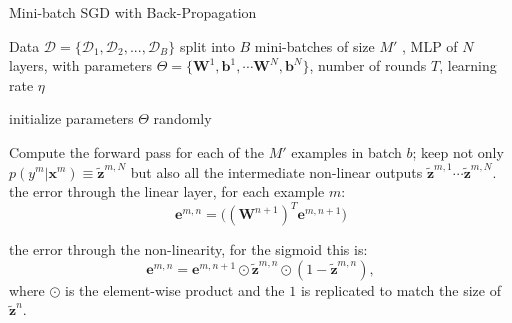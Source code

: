 \begin{algorithm}[th!]

   \caption{Mini-batch SGD with Back-Propagation}

\begin{algorithmic}[1]
\label{algo:backprop}

Data $\mathcal{D}=\{\mathcal{D}_1,\mathcal{D}_2,...,\mathcal{D}_B\}$ split into $B$ mini-batches of size $M'$%
, MLP of $N$ layers, with parameters $\Theta=\{\mathbf{W}^1, \mathbf{b}^1, \cdots \mathbf{W}^N, \mathbf{b}^N\}$, number of rounds $T$, learning rate $\eta$

   \STATE initialize parameters $\Theta$ randomly 


	\vspace{0.3cm}
	\STATE Compute the {forward pass} for each of the $M'$ examples in batch $b$; 
	 keep not only $p(y^m|\mathbf{x}^m) \equiv \tilde{\mathbf{z}}^{m,N}$ but also all the intermediate non-linear outputs $\tilde{\mathbf{z}}^{m,1} \cdots \tilde{\mathbf{z}}^{m,N}$.
	\ENDFOR	
	\vspace{0.3cm}
		\ENDFOR	
        \ELSE
		 the error through the linear layer, for each example $m$:  
        $$\mathbf{e}^{m,n} = \Big((\mathbf{W}^{n+1})^T \mathbf{e}^{m,n+1}\Big)$$ 
        
		 the error through the non-linearity, for the sigmoid this is:  
        $$\mathbf{e}^{m,n} = \mathbf{e}^{m,n+1} \odot \tilde{\mathbf{z}}^{m,n} \odot (\mathbf{\mathrm{1}}-\tilde{\mathbf{z}}^{m,n}),$$
        where $\odot$ is the element-wise product and the $\mathbf{\mathrm{1}}$ is replicated to match the size of $\tilde{\mathbf{z}}^n$.



\end{algorithmic}
\end{algorithm}

